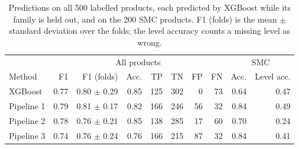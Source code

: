 \begin{table}[t]
\centering
\caption{Predictions on all 500 labelled products, each predicted by XGBoost while its family is held out, and on the 200 SMC products. F1 (folds) is the mean $\pm$ standard deviation over the folds; the level accuracy counts a missing level as wrong.}
\label{tab:ablation}
\begin{tabular}{lrrrrrrrrr}
\hline
 & \multicolumn{7}{c}{All products} & \multicolumn{2}{c}{SMC} \\
Method & F1 & F1 (folds) & Acc. & TP & TN & FP & FN & Acc. & Level acc. \\
\hline
XGBoost & 0.77 & 0.80 $\pm$ 0.29 & 0.85 & 125 & 302 & 0 & 73 & 0.64 & 0.47 \\
Pipeline 1 & 0.79 & 0.81 $\pm$ 0.17 & 0.82 & 166 & 246 & 56 & 32 & 0.84 & 0.49 \\
Pipeline 2 & 0.78 & 0.76 $\pm$ 0.21 & 0.85 & 138 & 285 & 17 & 60 & 0.70 & 0.24 \\
Pipeline 3 & 0.74 & 0.76 $\pm$ 0.24 & 0.76 & 166 & 215 & 87 & 32 & 0.84 & 0.41 \\
\hline
\end{tabular}
\end{table}
